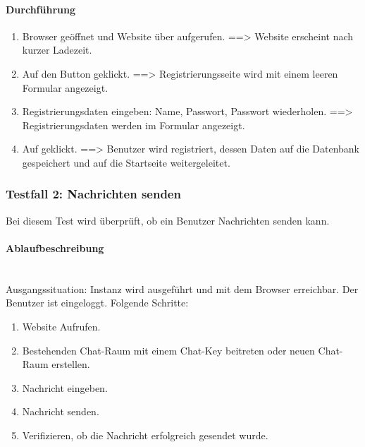 \paragraph{Durchführung}
\begin{enumerate}
  \item Browser geöffnet und Website über  aufgerufen. \newline
  ==> Website erscheint nach kurzer Ladezeit.
  \item Auf den Button  geklickt. \newline
  ==> Registrierungsseite wird mit einem leeren Formular angezeigt.
  \item Registrierungsdaten eingeben: Name, Passwort, Passwort wiederholen. \newline
  ==> Registrierungsdaten werden im Formular angezeigt.
  \item Auf  geklickt. \newline
  ==> Benutzer wird registriert, dessen Daten auf die Datenbank gespeichert und auf die Startseite weitergeleitet.
\end{enumerate}

\subsubsection{Testfall 2: Nachrichten senden}
Bei diesem Test wird überprüft, ob ein Benutzer Nachrichten senden kann.
\paragraph{Ablaufbeschreibung} \mbox{}\\
Ausgangssituation: Instanz wird ausgeführt und mit dem Browser erreichbar. Der Benutzer ist eingeloggt. Folgende Schritte: 

\begin{enumerate}
  \item Website Aufrufen.
  \item Bestehenden Chat-Raum mit einem Chat-Key beitreten oder neuen Chat-Raum erstellen.
  \item Nachricht eingeben.
  \item Nachricht senden.
  \item Verifizieren, ob die Nachricht erfolgreich gesendet wurde.
\end{enumerate}

